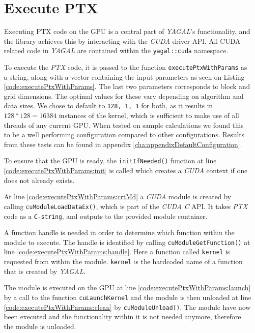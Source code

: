 \section{Execute PTX} \label{cha:execPtx}
Executing PTX code on the GPU is a central part of \textit{YAGAL}'s functionality, and the library achieves this by interacting with the \textit{CUDA} driver API. All CUDA related code in \textit{YAGAL} are contained within the \texttt{yagal::cuda} namespace.

To execute the \textit{PTX} code, it is passed to the function \texttt{executePtxWithParams} as a string, along with a vector containing the input parameters as seen on Listing \ref{code:executePtxWithParams}. The last two parameters corresponds to block and grid dimensions. The optimal values for these vary depending on algorithm and data sizes. We chose to default to \texttt{128, 1, 1} for both, as it results in $128*128=16384$ instances of the kernel, which is sufficient to make use of all threads of any current GPU. When tested on sample calculations we found this to be a well performing configuration compared to other configurations. Results from these tests can be found in appendix \ref{cha:appendixDefaultConfiguration}.

To ensure that the GPU is ready, the \texttt{initIfNeeded()} function at line \ref{code:executePtxWithParams:init} is called which creates a \textit{CUDA} context if one does not already exists.

At line \ref{code:executePtxWithParams:crtMd} a \textit{CUDA} module is created by calling \texttt{cuModuleLoadDataEx()}, which is part of the \textit{CUDA C} API. It takes \textit{PTX} code as a \texttt{C-string}, and outputs to the provided module container.

A function handle is needed in order to determine which function within the module to execute. The handle is identified by calling \texttt{cuModuleGetFunction()} at line \ref{code:executePtxWithParams:handle}. Here a function called \texttt{kernel} is requested from within the module. \texttt{kernel} is the hardcoded name of a function that is created by \textit{YAGAL}.

The module is executed on the GPU at line \ref{code:executePtxWithParams:launch} by a call to the function \texttt{cuLaunchKernel} and the module is then unloaded at line \ref{code:executePtxWithParams:clean} by \texttt{cuModuleUnload()}. The module have now been executed and the functionality within it is not needed anymore, therefore the module is unloaded.

